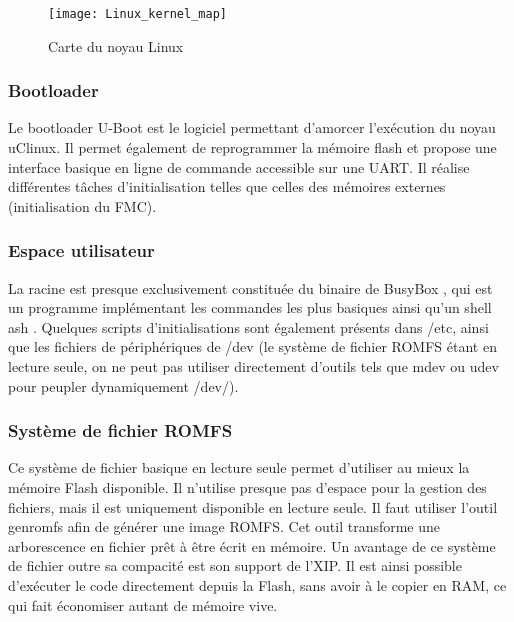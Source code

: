 \begin{figure}[H]
	\begin{center}
		\texttt{[image: Linux\_kernel\_map]}
	\end{center}
	\caption{Carte du noyau Linux}
\end{figure}

\subsubsection{Bootloader}
Le bootloader U-Boot est le logiciel permettant d'amorcer l'exécution du noyau uClinux.
Il permet également de reprogrammer la mémoire flash et propose une interface basique en ligne de commande accessible sur une UART.
Il réalise différentes tâches d'initialisation telles que celles des mémoires externes (initialisation du \gls{FMC}).

\subsubsection{Espace utilisateur}
La racine est presque exclusivement constituée du binaire de BusyBox \autocite{BusyBox}, qui est un programme implémentant les commandes les plus basiques ainsi qu'un shell ash \autocite{Ash}.
Quelques scripts d'initialisations sont également présents dans /etc, ainsi que les fichiers de périphériques de /dev (le système de fichier ROMFS \autocite{ROMFS} étant en lecture seule, on ne peut pas utiliser directement d'outils tels que mdev ou udev pour peupler dynamiquement /dev/).

\subsubsection{Système de fichier ROMFS}
Ce système de fichier basique en lecture seule permet d'utiliser au mieux la mémoire Flash disponible.
Il n'utilise presque pas d'espace pour la gestion des fichiers, mais il est uniquement disponible en lecture seule.
Il faut utiliser l'outil genromfs \autocite{ROMFS} afin de générer une image ROMFS.
Cet outil transforme une arborescence en fichier prêt à être écrit en mémoire.
Un avantage de ce système de fichier outre sa compacité est son support de l'\gls{XIP}.
Il est ainsi possible d'exécuter le code directement depuis la Flash, sans avoir à le copier en RAM, ce qui fait économiser autant de mémoire vive.
        

